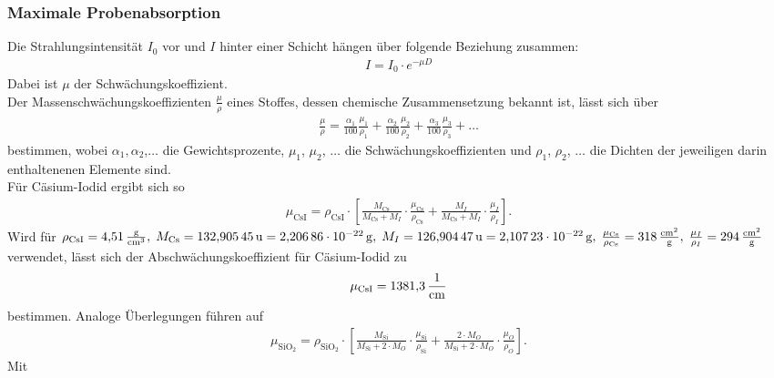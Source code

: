 \documentclass[a4paper,twoside,final]{article}
\begin{document}
\subsubsection{Maximale Probenabsorption}\label{sec:Probenabsorption}

Die Strahlungsintensität $I_0$ vor und $I$ hinter einer Schicht hängen über folgende Beziehung zusammen:
\begin{align}\label{equ:Probenabsorption}
  I = I_0 \cdot e^{-\mu D}
\end{align}
Dabei ist $\mu$ der Schwächungskoeffizient. \\
Der Massenschwächungskoeffizienten $\frac{\mu}{\rho}$ eines Stoffes, dessen chemische Zusammensetzung bekannt ist, lässt sich über
\begin{align}
  \frac{\mu}{\rho} = \frac{\alpha_1}{100}\frac{\mu_1}{\rho_1}+\frac{\alpha_2}{100}\frac{\mu_2}{\rho_2}+\frac{\alpha_3}{100}\frac{\mu_3}{\rho_3}+\hdots
\end{align}
bestimmen, wobei $\alpha_1, \alpha_2$,$\hdots$ die Gewichtsprozente, $\mu_1$, $\mu_2$, $\hdots$ die Schwächungskoeffizienten und $\rho_1$, $\rho_2$, $\hdots$  die Dichten der jeweiligen darin enthaltenenen Elemente sind. \cite{Glocker}\\
Für Cäsium-Iodid ergibt sich so
\begin{align}
  \mu_\text{CsI} = \rho_\text{CsI} \cdot \left[\frac{M_\text{Cs}}{M_\text{Cs}+M_{I}}\cdot \frac{\mu_\text{Cs}}{\rho_\text{Cs}}+\frac{M_{I}}{M_\text{Cs}+M_I}\cdot \frac{\mu_I}{\rho_I}\right].
\end{align}
Wird für $\rho_\text{CsI} = \SI{4,51}{\frac{\gram}{\centi\meter\cubed}},\; M_\text{Cs} = \SI{132,90545}{\text{u}}=\SI{2,20686E-22}{\gram},\; M_{I} = \SI{126,90447}{\text{u}}=\SI{2,10723E-22}{\gram},\; \frac{\mu_\text{Cs}}{\rho_\text{Cs}} = \SI{318}{\frac{\centi\meter\squared}{\gram}}, \;\frac{\mu_{I}}{\rho_{I}} = \SI{294}{\frac{\centi\meter\squared}{\gram}} $
verwendet, lässt sich der Abschwächungskoeffizient für Cäsium-Iodid zu
\begin{align}\label{equ:mü_CSI}
\mu_\text{CsI}= \SI{1381,3}{\frac{1}{\centi\meter}}
\end{align}
bestimmen.
Analoge Überlegungen führen auf
\begin{align}
  \mu_\text{SiO$_2$} = \rho_\text{SiO$_2$} \cdot \left[\frac{M_\text{Si}}{M_\text{Si}+2\cdot M_{O}}\cdot \frac{\mu_\text{Si}}{\rho_\text{Si}}+\frac{2\cdot M_{O}}{M_\text{Si}+2\cdot M_O}\cdot \frac{\mu_O}{\rho_O}\right].
\end{align}
Mit
\end{document}
